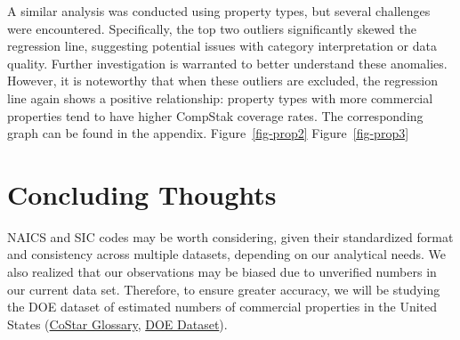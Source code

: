 \documentclass[
  12pt]{article}
\begin{document}
\begin{figure}


\caption{\label{fig-prop1}}

\end{figure}%

A similar analysis was conducted using property types, but several
challenges were encountered. Specifically, the top two outliers
significantly skewed the regression line, suggesting potential issues
with category interpretation or data quality. Further investigation is
warranted to better understand these anomalies. However, it is
noteworthy that when these outliers are excluded, the regression line
again shows a positive relationship: property types with more commercial
properties tend to have higher CompStak coverage rates. The
corresponding graph can be found in the appendix. Figure~\ref{fig-prop2}
Figure~\ref{fig-prop3}

\section{Concluding Thoughts}\label{concluding-thoughts}

NAICS and SIC codes may be worth considering, given their standardized
format and consistency across multiple datasets, depending on our
analytical needs. We also realized that our observations may be biased
due to unverified numbers in our current data set. Therefore, to ensure
greater accuracy, we will be studying the DOE dataset of estimated
numbers of commercial properties in the United States
(\href{https://www.costar.com/about/costar-glossary}{CoStar Glossary},
\href{https://catalog.data.gov/dataset/city-and-county-commercial-building-inventories-010d2}{DOE
Dataset}).
\end{document}
